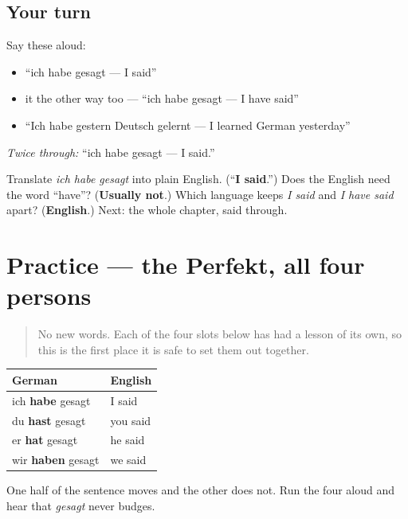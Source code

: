 \subsection*{Your turn}
Say these aloud:

\begin{itemize}
\raggedright
  \item \textquotedblleft{}ich habe gesagt — I said\textquotedblright{}
  \item it the other way too — \textquotedblleft{}ich habe gesagt — I have said\textquotedblright{}
  \item \textquotedblleft{}Ich habe gestern Deutsch gelernt — I learned German yesterday\textquotedblright{}
\end{itemize}

\emph{Twice through:} \textquotedblleft{}ich habe gesagt — I said.\textquotedblright{}

\begin{tcolorbox}[breakable,colback=teal!4,colframe=teal!35!black,title={Before you move on}]
Translate \emph{ich habe gesagt} into plain English. (\textquotedblleft{}\textbf{I said}.\textquotedblright{}) Does the English need the word \textquotedblleft{}have\textquotedblright{}? (\textbf{Usually not}.) Which language keeps \emph{I said} and \emph{I have said} apart? (\textbf{English}.) Next: the whole chapter, said through.
\end{tcolorbox}
\section[Practice]{Practice — the Perfekt, all four persons}

\label{lesson:GE-C15-perfekt-practice}



\begin{quote}
No new words. Each of the four slots below has had a lesson of its own, so this is the first place it is safe to set them out together.
\end{quote}

\begin{grammarlens}[title={Grammar Lens: the four slots, assembled}]
\noindent
\begin{tabularx}{\linewidth}{@{}>{\raggedright\arraybackslash}X>{\raggedright\arraybackslash}X@{}}
\toprule
\textbf{German} & \textbf{English} \\
\midrule
ich \textbf{habe} gesagt & I said \\
du \textbf{hast} gesagt & you said \\
er \textbf{hat} gesagt & he said \\
wir \textbf{haben} gesagt & we said \\
\bottomrule
\end{tabularx}

One half of the sentence moves and the other does not. Run the four aloud and hear that \emph{gesagt} never budges.
\end{grammarlens}

